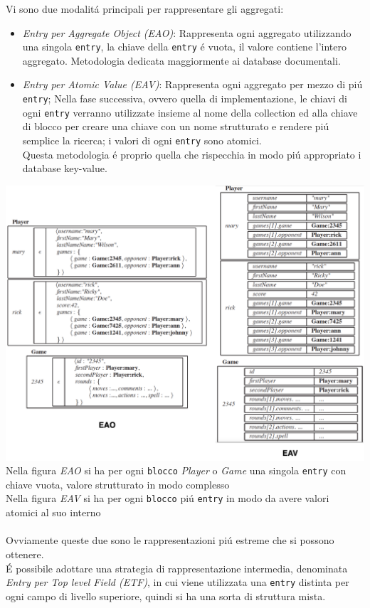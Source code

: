 Vi sono due modalitá principali per rappresentare gli aggregati:
\begin{itemize}
    \item \emph{Entry per Aggregate Object (EAO)}: Rappresenta ogni aggregato utilizzando una singola
    \texttt{entry}, la chiave della \texttt{entry} é vuota, il valore contiene l'intero aggregato.
    Metodologia dedicata maggiormente ai database documentali.
    \item \emph{Entry per Atomic Value (EAV)}: Rappresenta ogni aggregato per mezzo di piú \texttt{entry};
    Nella fase successiva, ovvero quella di implementazione, le chiavi di ogni \texttt{entry} verranno utilizzate
    insieme al nome della collection ed alla chiave di blocco per creare una chiave con un
    nome strutturato e rendere piú semplice la ricerca;
    i valori di ogni \texttt{entry} sono atomici.\\
    Questa metodologia é proprio quella che rispecchia in modo piú appropriato i database key-value.
\end{itemize}
\vspace{0.5cm}
    \includegraphics[width=1\textwidth]{img/eao.eav}
Nella figura \emph{EAO} si ha per ogni \texttt{blocco} \emph{Player} o \emph{Game} una singola \texttt{entry} con chiave vuota,
valore strutturato in modo complesso
\\
Nella figura \emph{EAV} si ha per ogni \texttt{blocco} piú \texttt{entry} in modo da avere valori atomici al suo interno
\\
\\
Ovviamente queste due sono le rappresentazioni piú estreme che si possono ottenere.\\
É possibile adottare una strategia di rappresentazione intermedia, denominata \emph{Entry per Top level Field (ETF)}, in cui
viene utilizzata una \texttt{entry} distinta per ogni campo di livello superiore, quindi si ha una sorta di struttura mista.

